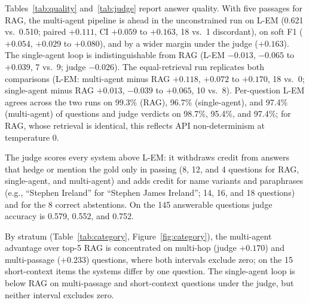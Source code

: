 \documentclass[11pt,a4paper]{article}
\newcommand{\lem}{L-EM}
\begin{document}
Tables~\ref{tab:quality} and~\ref{tab:judge} report answer quality.
With five passages for RAG, the multi-agent pipeline is ahead in the
unconstrained run on \lem{} (0.621 vs.\ 0.510; paired $+0.111$, CI $+0.059$
to $+0.163$, 18 vs.\ 1 discordant), on soft F1 ($+0.054$, $+0.029$ to
$+0.080$), and by a wider margin under the judge ($+0.163$).
The single-agent loop is indistinguishable from RAG (\lem{} $-0.013$,
$-0.065$ to $+0.039$, 7 vs.\ 9; judge $-0.026$).
The equal-retrieval run replicates both comparisons (\lem{}: multi-agent
minus RAG $+0.118$, $+0.072$ to $+0.170$, 18 vs.\ 0; single-agent minus RAG
$+0.013$, $-0.039$ to $+0.065$, 10 vs.\ 8).
Per-question \lem{} agrees across the two runs on 99.3\% (RAG), 96.7\%
(single-agent), and 97.4\% (multi-agent) of questions and judge verdicts on
98.7\%, 95.4\%, and 97.4\%; for RAG, whose retrieval is identical, this
reflects API non-determinism at temperature 0.

The judge scores every system above \lem{}: it withdraws credit from answers
that hedge or mention the gold only in passing (8, 12, and 4 questions for
RAG, single-agent, and multi-agent) and adds credit for name variants and
paraphrases (e.g., ``Stephen Ireland'' for ``Stephen James Ireland''; 14, 16,
and 18 questions) and for the 8 correct abstentions.
On the 145 answerable questions judge accuracy is 0.579, 0.552, and 0.752.

By stratum (Table~\ref{tab:category}, Figure~\ref{fig:category}), the
multi-agent advantage over top-5 RAG is concentrated on multi-hop
(judge $+0.170$) and multi-passage ($+0.233$) questions, where both intervals
exclude zero; on the 15 short-context items the systems differ by one
question.
The single-agent loop is below RAG on multi-passage and short-context
questions under the judge, but neither interval excludes zero.
\end{document}
